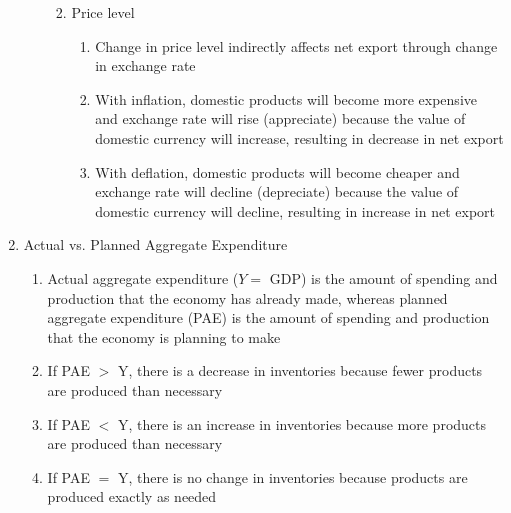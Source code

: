 \documentclass[12pt]{article}
\begin{document}
\begin{enumerate}
\begin{enumerate}
\begin{enumerate}
\begin{enumerate}
                \end{enumerate}

              \item Price level

                \begin{enumerate}

                  \item Change in price level indirectly affects net export through change in exchange rate

                  \item With inflation, domestic products will become more expensive and exchange rate will rise (appreciate) because the value of domestic currency will increase, resulting in decrease in net export

                  \item With deflation, domestic products will become cheaper and exchange rate will decline (depreciate) because the value of domestic currency will decline, resulting in increase in net export

                \end{enumerate}

            \end{enumerate}

        \end{enumerate}

      \item Actual vs. Planned Aggregate Expenditure

        \begin{enumerate}

          \item Actual aggregate expenditure ($Y=$ GDP) is the amount of spending and production that the economy has already made, whereas planned aggregate expenditure (PAE) is the amount of spending and production that the economy is planning to make

          \item If PAE $>$ Y, there is a decrease in inventories because fewer products are produced than necessary

          \item If PAE $<$ Y, there is an increase in inventories because more products are produced than necessary

          \item If PAE $=$ Y, there is no change in inventories because products are produced exactly as needed


\end{enumerate}
\end{enumerate}
\end{document}
